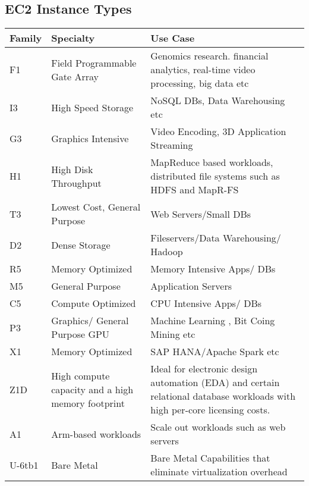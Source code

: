 \documentclass{article}
\begin{document}
\subsection{EC2 Instance Types}
	\begin{center}
		\begin{tabular}{ |p{1.5cm}|p{5cm}|p{8cm}|}		
		\hline
		\textbf{Family} & \textbf{Specialty} & \textbf{Use Case} \\
	 	\hline
	 	F1 & Field Programmable Gate Array & Genomics research. financial analytics, real-time video processing, big data etc \\ \hline
	 	I3 & High Speed Storage & NoSQL DBs, Data Warehousing etc \\ \hline
	 	G3 & Graphics Intensive & Video Encoding, 3D Application Streaming \\\hline
	 	H1 & High Disk Throughput & MapReduce based workloads, distributed file systems such as HDFS and MapR-FS \\ \hline
	 	T3 & Lowest Cost, General Purpose & Web Servers/Small DBs \\ \hline
	 	D2 & Dense Storage & Fileservers/Data Warehousing/ Hadoop \\ \hline
	 	R5 & Memory Optimized & Memory Intensive Apps/ DBs \\ \hline
	 	M5 & General Purpose & Application Servers \\ \hline
	 	C5 & Compute Optimized & CPU Intensive Apps/ DBs \\ \hline
	 	P3 & Graphics/ General Purpose GPU & Machine Learning , Bit Coing Mining etc \\ \hline
	 	X1 & Memory Optimized & SAP HANA/Apache Spark etc \\ \hline
	 	Z1D & High compute capacity and a high memory footprint & Ideal for electronic design automation (EDA) and certain relational database workloads with high per-core licensing costs. \\ \hline
	 	A1 & Arm-based workloads & Scale out workloads such as web servers \\ \hline
	 	U-6tb1 & Bare Metal & Bare Metal Capabilities that eliminate virtualization overhead \\	 	
	 	\hline
		\end{tabular}
	\end{center}
\end{document}
